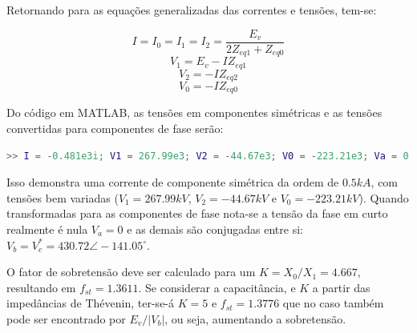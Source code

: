 Retornando para as equações generalizadas das correntes e tensões, tem-se:

\begin{equation}
I = I_0 = I_1 = I_2 = \frac{E_v}{2Z_{eq1}+Z_{eq0}}    
\end{equation}
\begin{equation}
V_1 = E_v - IZ_{eq1} 
\end{equation}
\begin{equation}
V_2 = - IZ_{eq2} 
\end{equation}
\begin{equation}
V_0 = - IZ_{eq0} 
\end{equation}

Do código em MATLAB, as tensões em componentes simétricas e as tensões convertidas para componentes de fase serão:



\begin{lstlisting}[language=Matlab,style=consolestyle]
>> I = -0.481e3i; V1 = 267.99e3; V2 = -44.67e3; V0 = -223.21e3; Va = 0; abs(Vb) = abs(Vc) = 430.72e3; angle(Vb) = - angle(Vc) = -141.05.
\end{lstlisting}

Isso demonstra uma corrente de componente simétrica da ordem de $0.5 kA$, com tensões bem variadas ($V_1 = 267.99 kV$, $V_2 = -44.67 kV$ e $V_0 = -223.21 kV$). Quando transformadas para as componentes de fase nota-se a tensão da fase em curto realmente é nula $V_a=0$ e as demais são conjugadas entre si: $V_b = V_c^* = 430.72 \angle -141.05^{\circ}$.

O fator de sobretensão deve ser calculado para um $K = X_0/X_1 = 4.667$, resultando em $f_{st} = 1.3611$. Se considerar a capacitância, e $K$ a partir das impedâncias de Thévenin, ter-se-á $K = 5$ e $f_{st} = 1.3776$ que no caso também pode ser encontrado por $E_v/|V_b|$, ou seja, aumentando a sobretensão.


\newpage